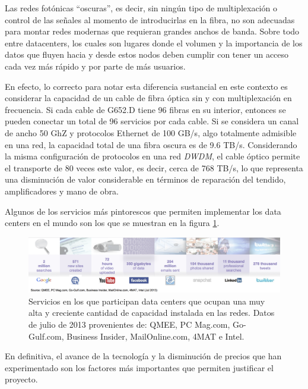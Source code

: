 Las redes fotónicas ``oscuras'', es decir, sin ningún tipo de
multiplexación o control de las señales al momento de introducirlas en
la fibra, no son adecuadas para montar redes modernas que requieran
grandes anchos de banda. Sobre todo entre datacenters, los cuales son
lugares donde el volumen y la importancia de los datos que fluyen
hacia y desde estos nodos deben cumplir con tener un acceso cada vez
más rápido y por parte de más usuarios.

En efecto, lo correcto para notar esta diferencia sustancial en este
contexto es considerar la capacidad de un cable de fibra óptica sin y
con multiplexación en frecuencia. Si cada cable de G652.D tiene 96
fibras en su interior, entonces se pueden conectar un total de 96
servicios por cada cable. Si se considera un canal de ancho 50 GhZ y
protocolos Ethernet de 100 GB/s, algo totalmente admisible en una red,
la capacidad total de una fibra oscura es de 9.6 TB/s. Considerando la
misma configuración de protocolos en una red \emph{DWDM}, el cable
óptico permite el transporte de 80 veces este valor, es decir, cerca
de 768 TB/s, lo que representa una disminución de valor considerable
en términos de reparación del tendido, amplificadores y mano de obra.

Algunos de los servicios más pintorescos que permiten implementar los
data centers en el mundo son los que se muestran en la figura
\ref{fig:servicios}.

\begin{figure}[H]
  \centering
  \includegraphics[width=15cm]{Imagenes/servicios.png}
  \caption{Servicios en los que participan data centers que ocupan una
    muy alta y creciente cantidad de capacidad instalada en las
    redes. Datos de julio de 2013 provenientes de: QMEE, PC Mag.com,
    Go-Gulf.com, Business Insider, MailOnline.com, 4MAT e Intel.}
  \label{fig:servicios}
\end{figure}

En definitiva, el avance de la tecnología y la disminución de precios
que han experimentado son los factores más importantes que permiten
justificar el proyecto. 

